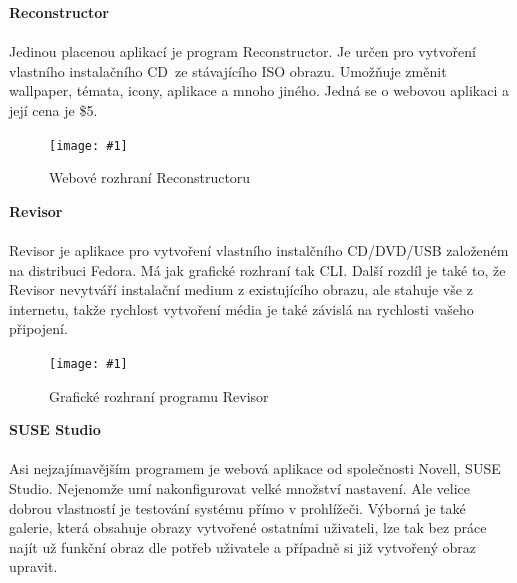 \documentclass[a4paper,12pt]{article}
\newcommand{\nadpis}[1]{%
	\vspace{4 mm}
	\textbf{#1}\\
	\vspace{4 mm}
	}
\newcommand{\obr}[3]{%
	\begin{figure}[h]
	\center\texttt{[image: \#1]}
	\caption{#3}
	\end{figure}
	}
\begin{document}
\nadpis{Reconstructor}\\
Jedinou placenou aplikací je program Reconstructor. Je určen pro vytvoření vlastního instalačního CD ze stávajícího ISO obrazu. Umožňuje změnit wallpaper, témata, icony, aplikace a mnoho jiného.
Jedná se o webovou aplikaci a její cena je \$5.\cite{Linux_Build}
\begin{center}
\obr{./img/screens/reconstructor.jpg}{0.5}{Webové rozhraní Reconstructoru}
\end{center}

\nadpis{Revisor}\\
Revisor je aplikace pro vytvoření vlastního instalčního CD/DVD/USB založeném na distribuci Fedora. Má jak grafické rozhraní tak CLI. Další rozdíl je také to, že Revisor nevytváří instalační medium z existujícího obrazu, ale stahuje vše z internetu, takže rychlost vytvoření média je také závislá na rychlosti vašeho připojení.\cite{Linux_Build}
\begin{center}
\obr{./img/screens/revisor.jpg}{0.7}{Grafické rozhraní programu Revisor}
\end{center}
\nadpis{SUSE Studio}\\
Asi nejzajímavějším programem je webová aplikace od společnosti Novell, SUSE Studio. Nejenomže umí nakonfigurovat velké množství nastavení. Ale velice dobrou vlastností je testování systému přímo v prohlížeči. Výborná je také galerie, která obsahuje obrazy vytvořené ostatními uživateli, lze tak bez práce najít už funkční obraz dle potřeb uživatele a případně si již vytvořený obraz upravit.
\end{document}
